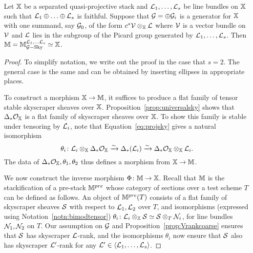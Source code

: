 \documentclass[12pt]{amsart}
\begin{document}
\begin{theorem}  \label{thm:tautological}
Let $\mathbb{X}$ be a separated quasi-projective stack and $\mathcal{L}_1,\ldots, \mathcal{L}_s$ be line bundles on $\mathbb{X}$ such that $\mathcal{L}_1 \oplus \ldots \oplus \mathcal{L}_s$ is faithful. Suppose that $\mathcal{G} = \oplus \mathcal{G}_i$ is a generator for $\mathbb{X}$ with one summand, say $\mathcal{G}_0$, of the form $c^* \mathcal{V} \otimes_{\mathbb{X}} \mathcal{L}$ where $\mathcal{V}$ is a vector bundle on $\mathcal{V}$ and $\mathcal{L}$ lies in the subgroup of the Picard group generated by $\mathcal{L}_1,\ldots, \mathcal{L}_s$. Then $\mathbb{M} = \mathbb{M}^{\mathcal{L}_1,\ldots\mathcal{L}_s}_{\mathcal{G}-\textup{Sky}} \simeq \mathbb{X}$.
\end{theorem}
\begin{proof}
To simplify notation, we write out the proof in the case that $s=2$. The general case is the same and can be obtained by inserting ellipses in appropriate places. 

To construct a morphism $\mathbb{X} \to \mathbb{M}$, it suffices to produce a flat family of tensor stable skyscraper sheaves over $\mathbb{X}$. Proposition~\ref{prop:universalsky} shows that $\Delta_* \mathcal{O}_{\mathbb{X}}$ is a flat family of skyscraper sheaves over $\mathbb{X}$. To show this family is stable under tensoring by $\mathcal{L}_i$, note that Equation~\ref{eq:projsky} gives a natural isomorphism
$$ \theta_i \colon \mathcal{L}_i \otimes_{\mathbb{X}} \Delta_* \mathcal{O}_{\mathbb{X}} \xrightarrow{\sim} \Delta_*(\mathcal{L}_i) \xrightarrow{\sim} \Delta_* \mathcal{O}_{\mathbb{X}} \otimes_{\mathbb{X}} \mathcal{L}_i .$$
The data of $\Delta_* \mathcal{O}_{\mathbb{X}}, \theta_1, \theta_2$ thus defines a morphism from $\mathbb{X} \to \mathbb{M}$. 

We now construct the inverse morphism $\Phi \colon \mathbb{M} \to \mathbb{X}$. Recall that $\mathbb{M}$ is the stackification of a pre-stack $\mathbb{M}^{pre}$ whose category of sections over a test scheme $T$ can be defined as follows. An object of $\mathbb{M}^{pre}(T)$ consists of a flat family of skyscraper sheaves $\mathcal{S}$ with respect to $\mathcal{L}_1,\mathcal{L}_2$ over $T$, and isomorphisms (expressed using Notation~\ref{notn:bimodtensor}) 
$\theta_i \colon \mathcal{L}_i \otimes_{\mathbb{X}} \mathcal{S} \simeq \mathcal{S} \otimes_T \mathcal{N}_i$, for line bundles $\mathcal{N}_1,\mathcal{N}_2$ on $T$. Our assumption on $\mathcal{G}$ and Proposition~\ref{prop:Vrankcoarse} ensures that $\mathcal{S}$ has skyscraper $\mathcal{L}$-rank, and the isomorphisms $\theta_i$ now ensure that $\mathcal{S}$ also has skyscraper $\mathcal{L}'$-rank for any $\mathcal{L}' \in \langle \mathcal{L}_1,\ldots, \mathcal{L}_s \rangle$. 


\end{proof}
\end{document}
